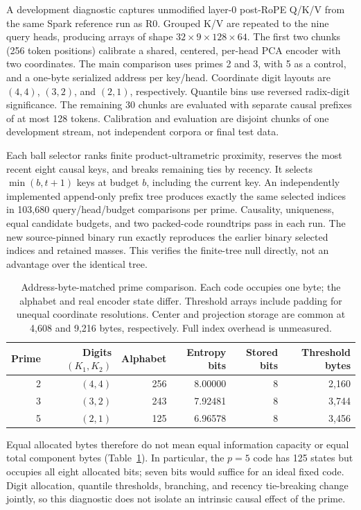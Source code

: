 \documentclass[11pt]{article}
\begin{document}
A development diagnostic captures unmodified layer-0 post-RoPE Q/K/V from the
same Spark reference run as R0. Grouped K/V are repeated to the nine query heads,
producing arrays of shape \(32\times9\times128\times64\). The first two chunks
(256 token positions) calibrate a shared, centered, per-head PCA encoder with
two coordinates. The main comparison uses primes 2 and 3, with 5 as a control,
and a one-byte serialized address per key/head. Coordinate digit layouts are
\((4,4)\), \((3,2)\), and \((2,1)\), respectively. Quantile bins use reversed
radix-digit significance. The remaining 30 chunks are evaluated with separate
causal prefixes of at most 128 tokens. Calibration and evaluation are disjoint
chunks of one development stream, not independent corpora or final test data.

Each ball selector ranks finite product-ultrametric proximity, reserves the
most recent eight causal keys, and breaks remaining ties by recency. It selects
\(\min(b,t+1)\) keys at budget \(b\), including the current key. An independently
implemented append-only prefix tree produces exactly the same selected indices
in 103,680 query/head/budget comparisons per prime. Causality, uniqueness, equal
candidate budgets, and two packed-code roundtrips pass in each run. The new
source-pinned binary run exactly reproduces the earlier binary selected indices
and retained masses. This verifies the finite-tree null directly, not an
advantage over the identical tree.

\begin{table}[htbp]
\centering
\small
\caption{Address-byte-matched prime comparison. Each code occupies one byte;
the alphabet and real encoder state differ. Threshold arrays include padding
for unequal coordinate resolutions. Center and projection storage are common
at 4,608 and 9,216 bytes, respectively. Full index overhead is unmeasured.}
\begin{tabular}{rrrrrr}
\toprule
Prime & Digits \((K_1,K_2)\) & Alphabet & Entropy bits & Stored bits & Threshold bytes\\
\midrule
2 & \((4,4)\) & 256 & 8.00000 & 8 & 2,160\\
3 & \((3,2)\) & 243 & 7.92481 & 8 & 3,744\\
5 & \((2,1)\) & 125 & 6.96578 & 8 & 3,456\\
\bottomrule
\end{tabular}
\label{tab:prime-capacity}
\end{table}

Equal allocated bytes therefore do not mean equal information capacity or equal
total component bytes (Table~\ref{tab:prime-capacity}). In particular, the
\(p=5\) code has 125 states but occupies all eight allocated bits; seven bits
would suffice for an ideal fixed code. Digit allocation, quantile thresholds,
branching, and recency tie-breaking change jointly, so this diagnostic does
not isolate an intrinsic causal effect of the prime.
\end{document}
